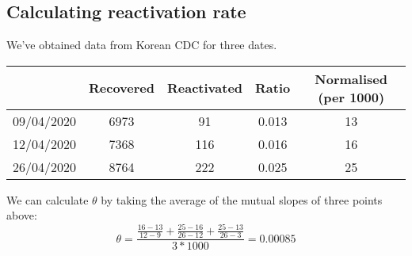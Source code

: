 \documentclass{article}
\begin{document}
	\subsection{Calculating reactivation rate}
	We've obtained data from Korean CDC for three dates.
	\begin{center}
		\begin{tabular}{ |c|c|c|c|c| } 
		 \hline
		  & Recovered & Reactivated & Ratio & Normalised (per 1000) \\ 
		 \hline
		 09/04/2020 & 6973 & 91 & 0.013 & 13 \\ 
		 \hline
		 12/04/2020 & 7368 & 116 & 0.016 & 16\\ 
		 \hline
		 26/04/2020 & 8764 & 222 & 0.025 & 25\\
		 \hline
		\end{tabular}
	\end{center}

	We can calculate $\theta$ by taking the average of the mutual slopes of three points above:
	\begin{equation*}
		\theta = \frac{\frac{16-13}{12-9} + \frac{25-16}{26-12} + \frac{25-13}{26-3}}{3*1000} = 0.00085
	\end{equation*}
\end{document}
